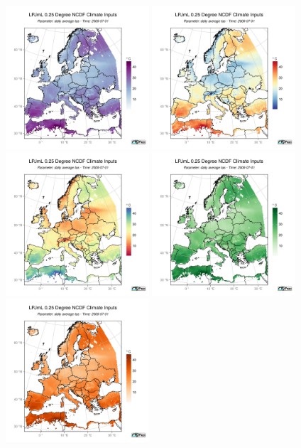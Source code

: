 \documentclass[a4paper,10pt]{article}
\begin{document}
\includegraphics[width=0.4\textwidth, height=0.4\textwidth]{col1}
\includegraphics[width=0.4\textwidth, height=0.4\textwidth]{col2}
\includegraphics[width=0.4\textwidth, height=0.4\textwidth]{col4}
\includegraphics[width=0.4\textwidth, height=0.4\textwidth]{col_12}
\includegraphics[width=0.4\textwidth, height=0.4\textwidth]{col_13}
\end{document}
